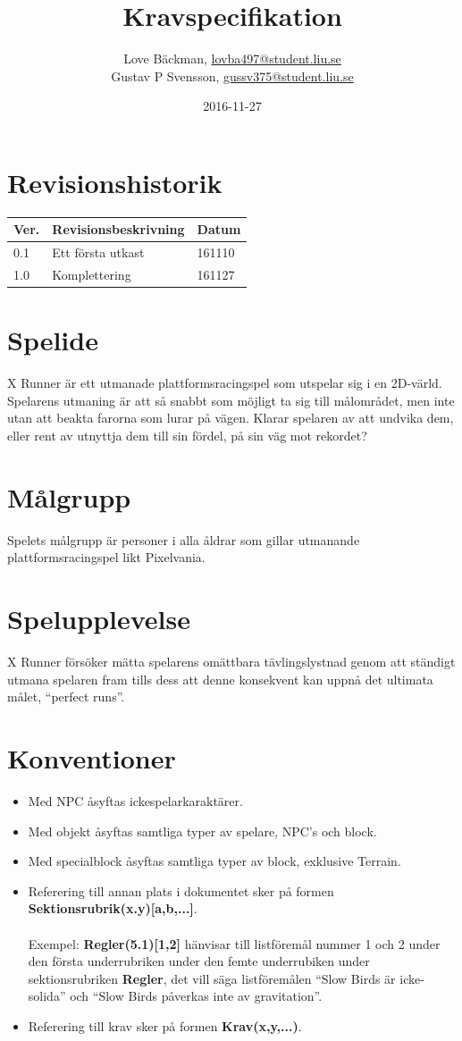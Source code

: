 \documentclass{TDP003mall}
\author{Love Bäckman, \url{lovba497@student.liu.se} \\
  Gustav P Svensson, \url{gussv375@student.liu.se}}
\title{Kravspecifikation}
\date{2016-11-27}
\begin{document}
\projectpage

\tableofcontents
\newpage

\section{Revisionshistorik}
\begin{table}[!h]
\begin{tabularx}{\linewidth}{|l|X|l|}
\hline
Ver. & Revisionsbeskrivning & Datum \\\hline
0.1 & Ett första utkast & 161110 \\\hline
1.0 & Komplettering & 161127 \\\hline
\end{tabularx}
\end{table}


\section{Spelide}
X Runner är ett utmanade plattformsracingspel som utspelar sig i en 2D-värld.
Spelarens utmaning är att så snabbt som möjligt ta sig till målområdet, men inte utan att beakta farorna som lurar på vägen. Klarar spelaren av att undvika dem, eller rent av utnyttja dem till sin fördel, på sin väg mot rekordet?

\section{Målgrupp}
Spelets målgrupp är personer i alla åldrar som gillar utmanande plattformsracingspel likt Pixelvania.

\section{Spelupplevelse}
X Runner försöker mätta spelarens omättbara tävlingslystnad genom att ständigt utmana spelaren fram tills dess att denne konsekvent kan uppnå det ultimata målet, ``perfect runs''.

\section{Konventioner}
\begin{itemize}
\item Med NPC åsyftas ickespelarkaraktärer.
\item Med objekt åsyftas samtliga typer av spelare, NPC's och block.
\item Med specialblock åsyftas samtliga typer av block, exklusive Terrain.
\item Referering till annan plats i dokumentet sker på formen \textbf{Sektionsrubrik(x.y)[a,b,...]}.
\\\\
Exempel: \textbf{Regler(5.1)[1,2]} hänvisar till listföremål nummer 1 och 2 under den första underrubriken under den femte underrubiken under sektionsrubriken \textbf{Regler}, det vill säga listföremålen ``Slow Birds är icke-solida'' och ``Slow Birds påverkas inte av gravitation''.
\item Referering till krav sker på formen \textbf{Krav(x,y,...)}.
\end{itemize}
\end{document}
